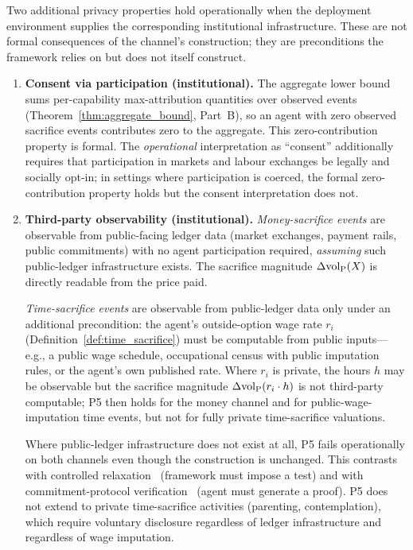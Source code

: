 \begin{proposition}
\label{prop:privacy_institutional}
Two additional privacy properties hold operationally when the
deployment environment supplies the corresponding institutional
infrastructure.  These are not formal consequences of the
channel's construction; they are preconditions the framework
relies on but does not itself construct.

\begin{enumerate}
\item[\textbf{(P2)}] \textbf{Consent via participation
  (institutional).}
  The aggregate lower bound sums per-capability max-attribution
  quantities over observed events
  (Theorem~\ref{thm:aggregate_bound}, Part~B), so an agent with
  zero observed sacrifice events contributes zero to the
  aggregate.  This zero-contribution property is formal.  The
  \emph{operational} interpretation as ``consent'' additionally
  requires that participation in markets and labour exchanges be
  legally and socially opt-in; in settings where participation
  is coerced, the formal zero-contribution property holds but
  the consent interpretation does not.

\item[\textbf{(P5)}] \textbf{Third-party observability
  (institutional).}
  \emph{Money-sacrifice events} are observable from
  public-facing ledger data (market exchanges, payment rails,
  public commitments) with no agent participation required,
  \emph{assuming} such public-ledger infrastructure exists.  The
  sacrifice magnitude $\Delta{\operatorname{vol}_{\mathrm{P}}}(X)$ is directly readable from
  the price paid.

  \emph{Time-sacrifice events} are observable from public-ledger
  data only under an additional precondition: the agent's
  outside-option wage rate $r_i$ (Definition~\ref{def:time_sacrifice})
  must be computable from public inputs---e.g., a public wage
  schedule, occupational census with public imputation rules, or
  the agent's own published rate.  Where $r_i$ is private, the
  hours $h$ may be observable but the sacrifice magnitude
  $\Delta{\operatorname{vol}_{\mathrm{P}}}(r_i \cdot h)$ is not third-party computable;
  P5 then holds for the money channel and for
  public-wage-imputation time events, but not for fully private
  time-sacrifice valuations.

  Where public-ledger infrastructure does not exist at all, P5
  fails operationally on both channels even though the
  construction is unchanged.  This contrasts with controlled
  relaxation~\citep{lasser2026wamura} (framework must impose a
  test) and with commitment-protocol
  verification~\citep{lasser2026exo} (agent must generate a
  proof).  P5 does not extend to private time-sacrifice
  activities (parenting, contemplation), which require voluntary
  disclosure regardless of ledger infrastructure and regardless
  of wage imputation.
\end{enumerate}
\end{proposition}

